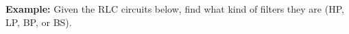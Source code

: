 \documentclass{article}
\begin{document}
\begin{comment}

{\bf Summary:}
\begin{itemize}

\item The resonant frequency of both series and parallel RCL circuits is
  completely determined by $L$ and $C$: $\omega_n=1/\sqrt{LC}$, independent 
  of the resistance $R$ in the circuit.

\item At the resonant frequency $\omega=\omega_n$, the impedance $Z=1/Y$ of
  a series RCL circuit is real and minimized (admittance maximized), and the 
  current through the three components reaches maximum; the admittance $Y=1/Z$ 
  of a parallel RCL circuit is real and minimized (impedance maximized), and 
  the voltage across the three components reaches maximum. 

\item In series RCL with voltage input and parallel RCL with current input, 
  the quality factor $Q$ is proportional to the ratio between $L$ and $C$:
  \begin{equation} 
    Q_s=\frac{1}{R}\sqrt{\frac{L}{C}},\;\;\;\;Q_p=R\sqrt{\frac{C}{L}}=\frac{1}{Q_s} 
  \end{equation}

\item In series RCL, $Q_s$ is inversely proportional to $R$ (the larger $R$, 
  the smaller $Q_s$, and the wider bandwidth), while in parallel RCL, $Q_p$ 
  is proportional to $R$ (the larger $R$, the larger $Q_p$,
  and the narrower bandwidth).
\end{itemize}



  See \htmladdnormallink{this website}{http://fourier.eng.hmc.edu/e80/active_filter/index.html} for more detailed discussions of second-order systems.

\end{comment}


{\bf Example:} Given the RLC circuits below, find what kind of filters they
are (HP, LP, BP, or BS).
\end{document}
